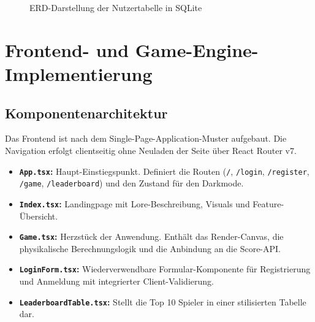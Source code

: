 \documentclass[12pt,a4paper]{article}
\begin{document}
\begin{figure}[htbp]
  \centering
  \caption{ERD-Darstellung der Nutzertabelle in SQLite}
  \label{fig:erd}
\end{figure}

\section{Frontend- und Game-Engine-Implementierung}

\subsection{Komponentenarchitektur}
Das Frontend ist nach dem Single-Page-Application-Muster aufgebaut. Die Navigation erfolgt clientseitig ohne Neuladen der Seite über React Router v7.

\begin{itemize}
  \item \textbf{\texttt{App.tsx}:} Haupt-Einstiegspunkt. Definiert die Routen (\texttt{/}, \texttt{/login}, \texttt{/register}, \texttt{/game}, \texttt{/leaderboard}) und den Zustand für den Darkmode.
  \item \textbf{\texttt{Index.tsx}:} Landingpage mit Lore-Beschreibung, Visuals und Feature-Übersicht.
  \item \textbf{\texttt{Game.tsx}:} Herzstück der Anwendung. Enthält das Render-Canvas, die physikalische Berechnungslogik und die Anbindung an die Score-API.
  \item \textbf{\texttt{LoginForm.tsx}:} Wiederverwendbare Formular-Komponente für Registrierung und Anmeldung mit integrierter Client-Validierung.
  \item \textbf{\texttt{LeaderboardTable.tsx}:} Stellt die Top 10 Spieler in einer stilisierten Tabelle dar.
\end{itemize}
\end{document}

